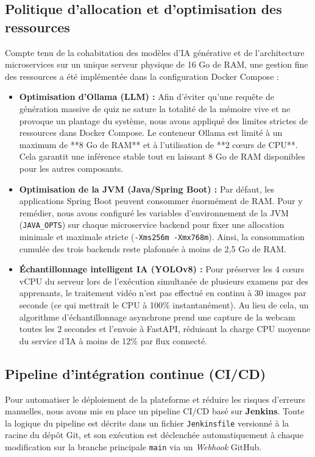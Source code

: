 \subsection{Politique d'allocation et d'optimisation des ressources}
Compte tenu de la cohabitation des modèles d'IA générative et de l'architecture microservices sur un unique serveur physique de 16 Go de RAM, une gestion fine des ressources a été implémentée dans la configuration Docker Compose :
\begin{itemize}
    \item \textbf{Optimisation d'Ollama (LLM) :} Afin d'éviter qu'une requête de génération massive de quiz ne sature la totalité de la mémoire vive et ne provoque un plantage du système, nous avons appliqué des limites strictes de ressources dans Docker Compose. Le conteneur Ollama est limité à un maximum de **8 Go de RAM** et à l'utilisation de **2 cœurs de CPU**. Cela garantit une inférence stable tout en laissant 8 Go de RAM disponibles pour les autres composants.
    \item \textbf{Optimisation de la JVM (Java/Spring Boot) :} Par défaut, les applications Spring Boot peuvent consommer énormément de RAM. Pour y remédier, nous avons configuré les variables d'environnement de la JVM (\texttt{JAVA\_OPTS}) sur chaque microservice backend pour fixer une allocation minimale et maximale stricte (\texttt{-Xms256m -Xmx768m}). Ainsi, la consommation cumulée des trois backends reste plafonnée à moins de 2,5 Go de RAM.
    \item \textbf{Échantillonnage intelligent IA (YOLOv8) :} Pour préserver les 4 cœurs vCPU du serveur lors de l'exécution simultanée de plusieurs examens par des apprenants, le traitement vidéo n'est pas effectué en continu à 30 images par seconde (ce qui mettrait le CPU à 100\% instantanément). Au lieu de cela, un algorithme d'échantillonnage asynchrone prend une capture de la webcam toutes les 2 secondes et l'envoie à FastAPI, réduisant la charge CPU moyenne du service d'IA à moins de 12\% par flux connecté.
\end{itemize}

\subsection{Pipeline d'intégration continue (CI/CD)}
Pour automatiser le déploiement de la plateforme et réduire les risques d'erreurs manuelles, nous avons mis en place un pipeline CI/CD basé sur \textbf{Jenkins}. Toute la logique du pipeline est décrite dans un fichier \texttt{Jenkinsfile} versionné à la racine du dépôt Git, et son exécution est déclenchée automatiquement à chaque modification sur la branche principale \texttt{main} via un \textit{Webhook} GitHub.

